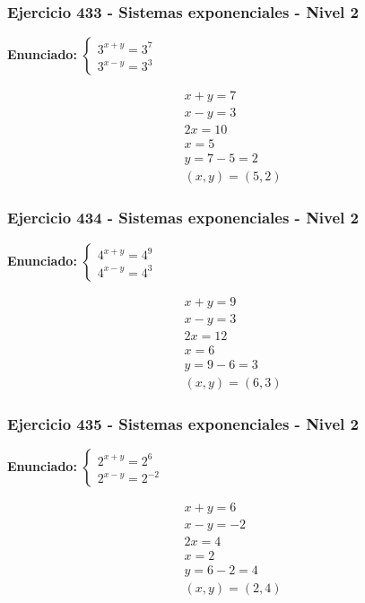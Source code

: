 \documentclass[12pt,a4paper]{article}
\begin{document}
\subsubsection*{Ejercicio 433 - Sistemas exponenciales - Nivel 2}
\textbf{Enunciado:} \(\begin{cases} 3^{x+y}=3^{7}\\ 3^{x-y}=3^{3}\end{cases}\)

\[
\begin{aligned}
x+y=7\\
x-y=3\\
2x=10\\
x=5\\
y=7-5=2\\
\boxed{(x,y)=(5,2)}
\end{aligned}
\]


\subsubsection*{Ejercicio 434 - Sistemas exponenciales - Nivel 2}
\textbf{Enunciado:} \(\begin{cases} 4^{x+y}=4^{9}\\ 4^{x-y}=4^{3}\end{cases}\)

\[
\begin{aligned}
x+y=9\\
x-y=3\\
2x=12\\
x=6\\
y=9-6=3\\
\boxed{(x,y)=(6,3)}
\end{aligned}
\]


\subsubsection*{Ejercicio 435 - Sistemas exponenciales - Nivel 2}
\textbf{Enunciado:} \(\begin{cases} 2^{x+y}=2^{6}\\ 2^{x-y}=2^{-2}\end{cases}\)

\[
\begin{aligned}
x+y=6\\
x-y=-2\\
2x=4\\
x=2\\
y=6-2=4\\
\boxed{(x,y)=(2,4)}
\end{aligned}
\]
\end{document}

